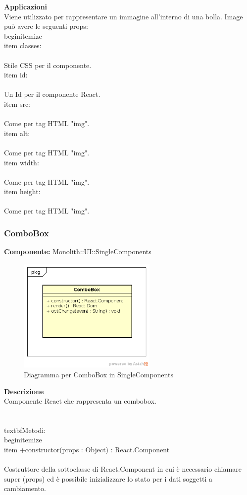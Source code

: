 \textbf{Applicazioni}\\
Viene utilizzato per rappresentare un immagine all'interno di una bolla.
Image può avere le seguenti props:
\\begin{itemize}
\\item classes:
\\\\
Stile CSS per il componente.
\\item id:
\\\\
Un Id per il componente React.
\\item src: 
\\\\
Come per tag HTML "img".
\\item alt: 
\\\\
Come per tag HTML "img".
\\item width: \\\\
Come per tag HTML "img".
\\item height: \\\\
Come per tag HTML "img". 


\clearpage

\subsubsection{ComboBox}
\textbf{Componente:}  Monolith::UI::SingleComponents\\
   \FloatBarrier
   \begin{figure}[ht]
   \centering
   \includegraphics[width=0.6\textwidth]{img/single-ComboBox}
   \caption{{Diagramma per ComboBox in SingleComponents}}
\end{figure}
\FloatBarrier
\textbf{Descrizione}\\
Componente React che rappresenta un combobox. \\\\
\\textbf{Metodi:} 
\\begin{itemize}
\\item +constructor(props : Object) : React.Component 
\\\\
Costruttore della sottoclasse di React.Component in cui è necessario chiamare super (props) ed è possibile inizializzare lo stato per i dati soggetti a cambiamento.

